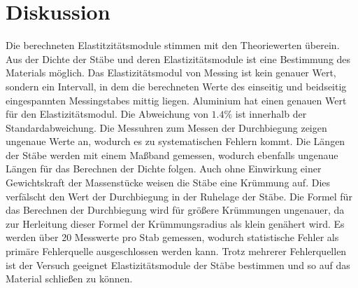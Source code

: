\section{Diskussion}
\label{sec:Diskussion}
Die berechneten Elastitzitätsmodule stimmen mit den Theoriewerten überein. Aus der Dichte der Stäbe und deren
Elastizitätsmodule ist eine Bestimmung des Materials möglich. Das Elastizitätsmodul von Messing ist kein
genauer Wert, sondern ein Intervall, in dem die berechneten Werte des einseitig und beidseitig eingespannten Messingstabes
mittig liegen. Aluminium hat einen genauen Wert für den Elastizitätsmodul. Die Abweichung von $1.4\%$ ist innerhalb der Standardabweichung.
Die Messuhren zum Messen der Durchbiegung
zeigen ungenaue Werte an, wodurch es zu systematischen Fehlern kommt. Die Längen der Stäbe werden mit
einem Maßband gemessen, wodurch ebenfalls ungenaue Längen für das Berechnen der Dichte folgen. Auch
ohne Einwirkung einer Gewichtskraft der Massenstücke weisen die Stäbe eine Krümmung auf. Dies
verfälscht den Wert der Durchbiegung in der Ruhelage der Stäbe. Die Formel für das Berechnen der
Durchbiegung wird für größere Krümmungen ungenauer, da zur Herleitung dieser Formel der
Krümmungsradius als klein genähert wird. Es werden über 20 Messwerte pro Stab gemessen, wodurch
statistische Fehler als primäre Fehlerquelle ausgeschlossen werden kann.
Trotz mehrerer Fehlerquellen ist der Versuch geeignet Elastizitätsmodule der Stäbe
bestimmen und so auf das Material schließen zu können.

